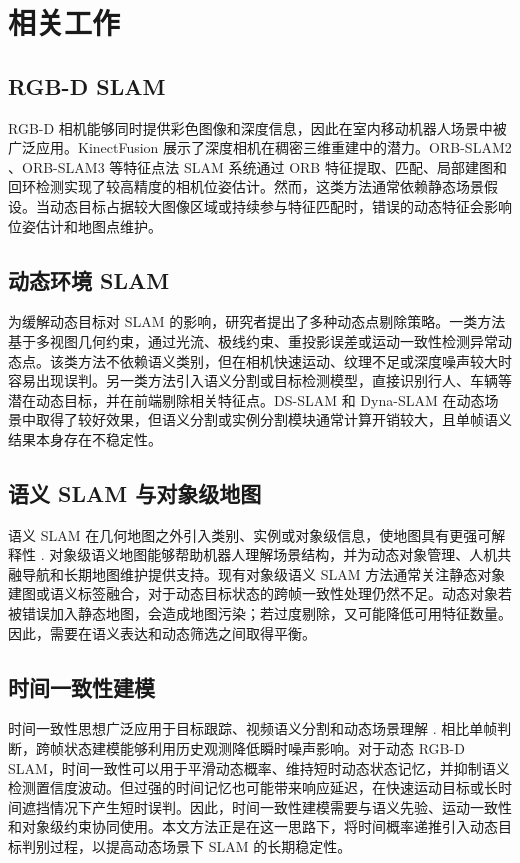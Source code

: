 \section{相关工作}

\subsection{RGB-D SLAM}

RGB-D 相机能够同时提供彩色图像和深度信息，因此在室内移动机器人场景中被广泛应用。KinectFusion \citep{newcombe2011kinectfusion} 展示了深度相机在稠密三维重建中的潜力。ORB-SLAM2 \citep{mur2017orb}、ORB-SLAM3 \citep{campos2021orb} 等特征点法 SLAM 系统通过 ORB 特征提取、匹配、局部建图和回环检测实现了较高精度的相机位姿估计。然而，这类方法通常依赖静态场景假设。当动态目标占据较大图像区域或持续参与特征匹配时，错误的动态特征会影响位姿估计和地图点维护。

\subsection{动态环境 SLAM}

为缓解动态目标对 SLAM 的影响，研究者提出了多种动态点剔除策略。一类方法基于多视图几何约束，通过光流、极线约束、重投影误差或运动一致性检测异常动态点。该类方法不依赖语义类别，但在相机快速运动、纹理不足或深度噪声较大时容易出现误判。另一类方法引入语义分割或目标检测模型，直接识别行人、车辆等潜在动态目标，并在前端剔除相关特征点。DS-SLAM \citep{yu2018ds} 和 Dyna-SLAM \citep{bescos2018dynaslam} 在动态场景中取得了较好效果，但语义分割或实例分割模块通常计算开销较大，且单帧语义结果本身存在不稳定性。

\subsection{语义 SLAM 与对象级地图}

语义 SLAM 在几何地图之外引入类别、实例或对象级信息，使地图具有更强可解释性 \citep{cadena2016past,mccormac2017semanticfusion}. 对象级语义地图能够帮助机器人理解场景结构，并为动态对象管理、人机共融导航和长期地图维护提供支持。现有对象级语义 SLAM 方法通常关注静态对象建图或语义标签融合，对于动态目标状态的跨帧一致性处理仍然不足。动态对象若被错误加入静态地图，会造成地图污染；若过度剔除，又可能降低可用特征数量。因此，需要在语义表达和动态筛选之间取得平衡。

\subsection{时间一致性建模}

时间一致性思想广泛应用于目标跟踪、视频语义分割和动态场景理解 \citep{voigtlaender2019mots,bertasius2020classifying}. 相比单帧判断，跨帧状态建模能够利用历史观测降低瞬时噪声影响。对于动态 RGB-D SLAM，时间一致性可以用于平滑动态概率、维持短时动态状态记忆，并抑制语义检测置信度波动。但过强的时间记忆也可能带来响应延迟，在快速运动目标或长时间遮挡情况下产生短时误判。因此，时间一致性建模需要与语义先验、运动一致性和对象级约束协同使用。本文方法正是在这一思路下，将时间概率递推引入动态目标判别过程，以提高动态场景下 SLAM 的长期稳定性。

